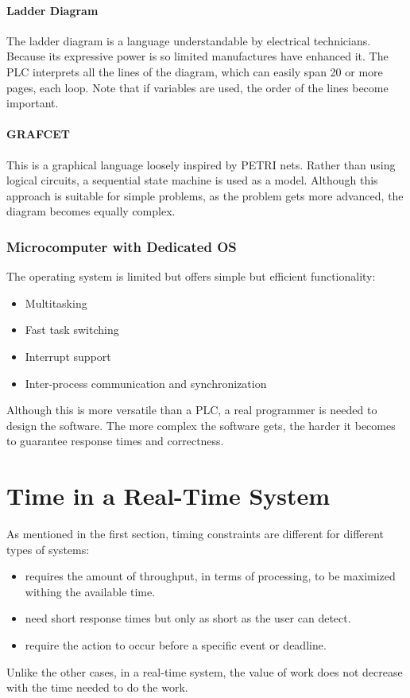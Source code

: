\paragraph{Ladder Diagram} 
The ladder diagram is a language understandable by electrical technicians. Because its expressive power is so limited manufactures have enhanced it. The PLC interprets all the lines of the diagram, which can easily span 20 or more pages, each loop. Note that if variables are used, the order of the lines become important.  

\paragraph{GRAFCET} This is a graphical language loosely inspired by PETRI nets. Rather than using logical circuits, a sequential state machine is used as a model. Although this approach is suitable for simple problems, as the problem gets more advanced, the diagram becomes equally complex.

\subsubsection{Microcomputer with Dedicated OS}
The operating system is limited but offers simple but efficient functionality:
\begin{itemize}
	\item Multitasking
	\item Fast task switching
	\item Interrupt support
	\item Inter-process communication and synchronization
\end{itemize}
Although this is more versatile than a PLC, a real programmer is needed to design the software. The more complex the software gets, the harder it becomes to guarantee response times and correctness.

\section{Time in a Real-Time System}
As mentioned in the first section, timing constraints are different for different types of systems:
\begin{itemize}
	\item {} requires the amount of throughput, in terms of processing, to be maximized withing the available time.
	\item {} need short response times but only as short as the user can detect.
	\item {} require the action to occur before a specific event or deadline.
\end{itemize}
Unlike the other cases, in a real-time system, the value of work does not decrease with the time needed to do the work. 

